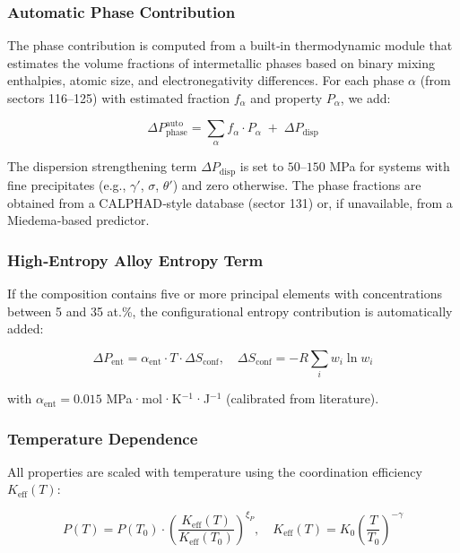 \documentclass[12pt,a4paper]{article}
\newcommand{\Keff}{K_{\mathrm{eff}}}
\begin{document}
	\subsubsection{Automatic Phase Contribution}
	The phase contribution is computed from a built‑in thermodynamic module that estimates the volume fractions of intermetallic phases based on binary mixing enthalpies, atomic size, and electronegativity differences. For each phase $\alpha$ (from sectors 116–125) with estimated fraction $f_{\alpha}$ and property $P_{\alpha}$, we add:
	
	\begin{equation}
		\Delta P_{\text{phase}}^{\text{auto}} = \sum_{\alpha} f_{\alpha} \cdot P_{\alpha} \;+\; \Delta P_{\text{disp}}
	\end{equation}
	
	The dispersion strengthening term $\Delta P_{\text{disp}}$ is set to $50$–$150$ MPa for systems with fine precipitates (e.g., $\gamma'$, $\sigma$, $\theta'$) and zero otherwise. The phase fractions are obtained from a CALPHAD‑style database (sector 131) or, if unavailable, from a Miedema‑based predictor.
	
	\subsubsection{High‑Entropy Alloy Entropy Term}
	If the composition contains five or more principal elements with concentrations between 5 and 35 at.\%, the configurational entropy contribution is automatically added:
	
	\begin{equation}
		\Delta P_{\text{ent}} = \alpha_{\text{ent}} \cdot T \cdot \Delta S_{\text{conf}}, \quad
		\Delta S_{\text{conf}} = -R \sum_i w_i \ln w_i
	\end{equation}
	
	with $\alpha_{\text{ent}} = 0.015$ MPa·mol·K\(^{-1}\)·J\(^{-1}\) (calibrated from literature).
	
	\subsubsection{Temperature Dependence}
	All properties are scaled with temperature using the coordination efficiency $\Keff(T)$:
	
	\begin{equation}
		P(T) = P(T_0) \cdot \left( \frac{\Keff(T)}{\Keff(T_0)} \right)^{\xi_P}, \quad
		\Keff(T) = K_0 \left( \frac{T}{T_0} \right)^{-\gamma}
	\end{equation}
	
\end{document}
